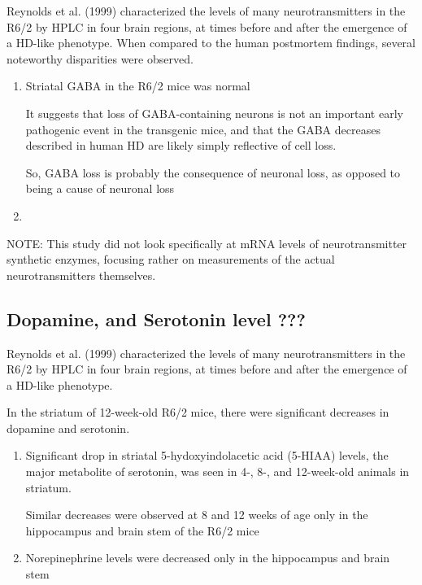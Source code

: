 Reynolds et al. (1999) characterized the levels of many neurotransmitters in the
R6/2  by HPLC in four brain regions, at times before and after the emergence of
a HD-like phenotype. When compared to the human postmortem findings, several
noteworthy disparities were observed.
\begin{enumerate}
  \item  Striatal GABA in the R6/2 mice was normal

 It suggests that loss of GABA-containing neurons is not an important early
  pathogenic event in the transgenic mice, and that the GABA decreases described
  in human HD are likely simply reflective of cell loss. 
  
 So, GABA loss is probably the consequence of neuronal loss, as opposed to
 being a cause of neuronal loss
  
  \item 
\end{enumerate}
NOTE: This study did not look specifically at mRNA levels of neurotransmitter
synthetic enzymes, focusing rather on measurements of the actual
neurotransmitters themselves. 



\subsection{Dopamine, and Serotonin level ???}
\label{sec:HD-theory-neurotransmitter-Dopamine}
\label{sec:HD-theory-neurotransmitter-Serotonine}

Reynolds et al. (1999) characterized the levels of many neurotransmitters in the
R6/2  by HPLC in four brain regions, at times before and after the emergence of
a HD-like phenotype.

In the striatum of 12-week-old R6/2 mice, there were significant decreases in
dopamine and serotonin.
\begin{enumerate}
  
  \item Significant drop in  striatal 5-hydoxyindolacetic acid (5-HIAA) levels,
  the major metabolite of serotonin, was seen in 4-, 8-, and 12-week-old animals
  in striatum.
  
  Similar decreases were observed at 8 and 12 weeks of age only in the
  hippocampus and brain stem of the R6/2 mice
  
  \item Norepinephrine levels were decreased only in the hippocampus and brain
  stem
  
\end{enumerate}

